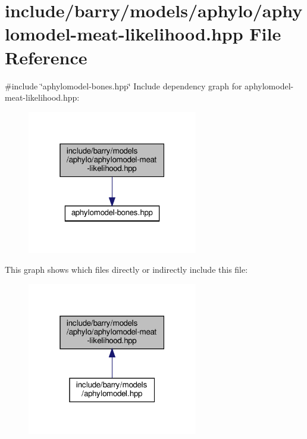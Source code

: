 \hypertarget{aphylomodel-meat-likelihood_8hpp}{}\section{include/barry/models/aphylo/aphylomodel-\/meat-\/likelihood.hpp File Reference}
\label{aphylomodel-meat-likelihood_8hpp}
{\ttfamily \#include \char`\"{}aphylomodel-\/bones.\+hpp\char`\"{}}\newline
Include dependency graph for aphylomodel-\/meat-\/likelihood.hpp\+:\nopagebreak
\begin{figure}[H]
\begin{center}
\leavevmode
\includegraphics[width=211pt]{aphylomodel-meat-likelihood_8hpp__incl}
\end{center}
\end{figure}
This graph shows which files directly or indirectly include this file\+:\nopagebreak
\begin{figure}[H]
\begin{center}
\leavevmode
\includegraphics[width=211pt]{aphylomodel-meat-likelihood_8hpp__dep__incl}
\end{center}
\end{figure}

